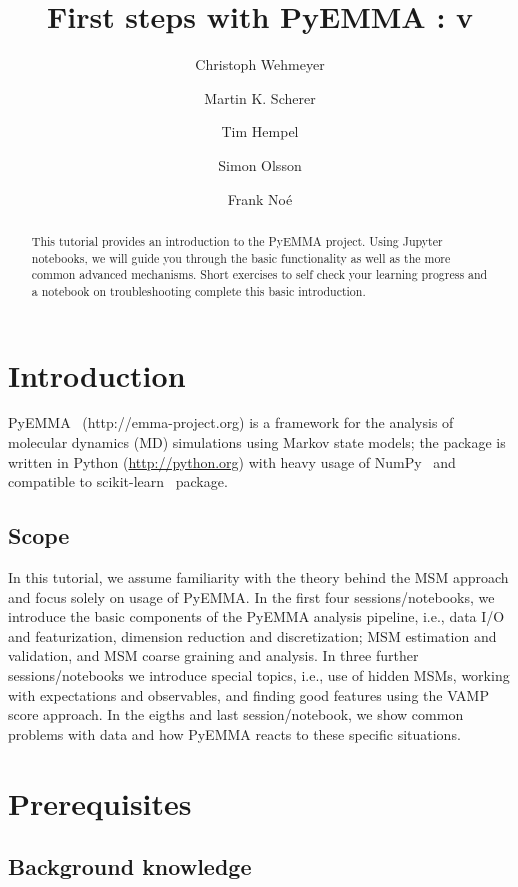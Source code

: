 \documentclass[9pt,tutorial,lineno,onehalfspacing]{livecoms}
\title{First steps with PyEMMA : v\versionnumber}
\author[1\authfn{1}*]{Christoph Wehmeyer}
\author[1\authfn{1}*]{Martin K. Scherer}
\author[1*]{Tim Hempel}
\author[1*]{Simon Olsson}
\author[1*]{Frank Noé}
\affil[1]{Department of Mathematics and Computer Science, Freie Universität Berlin, Arnimallee 6, 14195 Berlin, Germany}
\begin{document}
\begin{frontmatter}
\maketitle

\begin{abstract}
This tutorial provides an introduction to the PyEMMA project. Using Jupyter notebooks, we will guide you through the basic functionality as well as the more common advanced mechanisms. Short exercises to self check your learning progress and a notebook on troubleshooting complete this basic introduction.
\end{abstract}

\end{frontmatter}

\section{Introduction}

PyEMMA~\cite{pyemma} (http://emma-project.org) is a framework for the analysis of molecular dynamics (MD) simulations using Markov state models; the package is written in Python (\url{http://python.org}) with heavy usage of NumPy~\cite{numpy} and compatible to scikit-learn~\cite{sklearn} package.

\subsection{Scope}

In this tutorial, we assume familiarity with the theory behind the MSM approach and focus solely on usage of PyEMMA. In the first four sessions/notebooks, we introduce the basic components of the PyEMMA analysis pipeline, i.e., data I/O and featurization, dimension reduction and discretization; MSM estimation and validation, and MSM coarse graining and analysis. In three further sessions/notebooks we introduce special topics, i.e., use of hidden MSMs, working with expectations and observables, and finding good features using the VAMP score approach. In the eigths and last session/notebook, we show common problems with data and how PyEMMA reacts to these specific situations.

\section{Prerequisites}


\subsection{Background knowledge}
\end{document}
